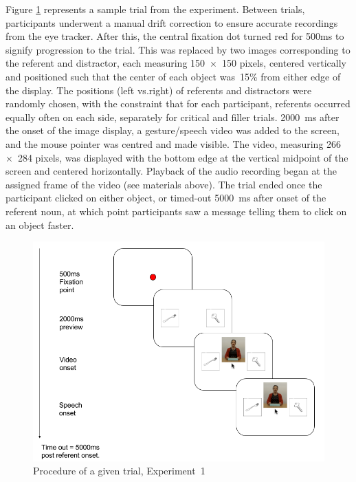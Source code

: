 \documentclass[a4paper,man,natbib]{apa6}
\begin{document}
Figure \ref{fig:v1_trial} represents a sample trial from the experiment. 
Between trials, participants underwent a manual drift correction to ensure accurate recordings from the eye tracker.
After this, the central fixation dot turned red for 500ms to signify progression to the trial. 
This was replaced by two images corresponding to the referent and distractor, each measuring 150~$\times$~150 pixels, centered vertically and positioned such that the center of each object was~15\% from either edge of the display. 
The positions (left vs.\@ right) of referents and distractors were randomly chosen, with the constraint that for each participant, referents occurred equally often on each side, separately for critical and filler trials.
2000~ms after the onset of the image display, a gesture/speech video was added to the screen, and the mouse pointer was centred and made visible.
The video, measuring 266~$\times$~284 pixels, was displayed with the bottom edge at the vertical midpoint of the screen and centered horizontally.
Playback of the audio recording began at the assigned frame of the video (see materials above).
The trial ended once the participant clicked on either object, or timed-out 5000~ms after onset of the referent noun, at which point participants saw a message telling them to click on an object faster.

\begin{figure}[Ht]
  \centering
	\includegraphics[width=\linewidth]{./img/e7_trial.png}
  \caption{Procedure of a given trial, Experiment~1}
  \label{fig:v1_trial}
\end{figure}
\end{document}
